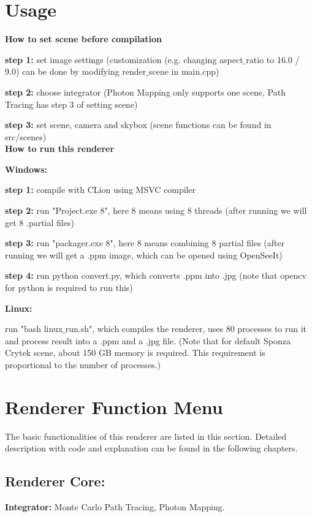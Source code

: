 \documentclass[utf8]{article}
\begin{document}
\newpage
\section{Usage}

\large \textbf{How to set scene before compilation}

\normalsize
\noindent
\textbf{step 1:} set image settings (customization (e.g. changing aspect$\_$ratio to 16.0 / 9.0) can be done by modifying render$\_$scene in main.cpp)

\noindent
\textbf{step 2:} choose integrator (Photon Mapping only supports one scene, Path Tracing has step 3 of setting scene)

\noindent
\textbf{step 3:} set scene, camera and skybox (scene functions can be found in src/scenes) \\

\noindent
\large \textbf{How to run this renderer}

\normalsize
\noindent
\textbf{Windows:}

\noindent
\textbf{step 1:} compile with CLion using MSVC compiler

\noindent
\textbf{step 2:} run "Project.exe 8", here 8 means using 8 threads (after running we will get 8 .partial files)

\noindent
\textbf{step 3:} run "packager.exe 8", here 8 means combining 8 partial files (after running we will get a .ppm image, which can be opened using OpenSeeIt)

\noindent
\textbf{step 4:} run python convert.py, which converts .ppm into .jpg (note that opencv for python is required to run this)

\noindent
\textbf{Linux:}

run "bash linux$\_$run.sh", which compiles the renderer, uses 80 processes to run it and process result into a .ppm and a .jpg file. (Note that for default Sponza Crytek scene, about 150 GB memory is required. This requirement is proportional to the number of processes.)

\section{Renderer Function Menu}
The basic functionalities of this renderer are listed in this section. Detailed description with code and explanation can be found in the following chapters.

\subsection{Renderer Core:}
\noindent
\textbf{Integrator: } Monte Carlo Path Tracing, Photon Mapping.
\end{document}

